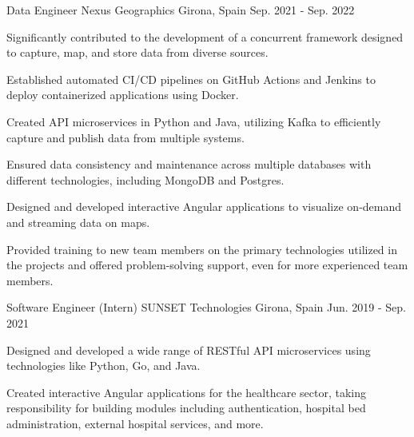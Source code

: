 \begin{cventries}
      \cventry
      {Data Engineer} %
      {Nexus Geographics} %
      {Girona, Spain} %
      {Sep. 2021 - Sep. 2022} %
      {
        \begin{cvitems}
        \item {Significantly contributed to the development of a concurrent framework designed to capture,
          map, and store data from diverse sources.}
        \item {Established automated CI/CD pipelines on GitHub Actions and Jenkins
          to deploy containerized applications using Docker.}
        \item {Created API microservices in Python and Java,
          utilizing Kafka to efficiently capture and publish data from multiple systems.}
        \item {Ensured data consistency and maintenance across multiple databases with different technologies,
          including MongoDB and Postgres.}
        \item {Designed and developed interactive Angular
          applications to visualize on-demand and streaming data on maps.}
        \item {Provided training to new team
          members on the primary technologies utilized in the projects and offered problem-solving support, even for more experienced team members.}
        \end{cvitems}
      }


      \cventry
      {Software Engineer (Intern)} %
      {SUNSET Technologies} %
      {Girona, Spain} %
      {Jun. 2019 - Sep. 2021} %
      {
        \begin{cvitems}
        \item {Designed and developed a wide range of RESTful API microservices
          using technologies like Python, Go, and Java.}
        \item {Created interactive Angular applications for the healthcare sector,
          taking responsibility for building modules including authentication,
          hospital bed administration, external hospital services, and more.}
        \end{cvitems}
      }

  \end{cventries}
